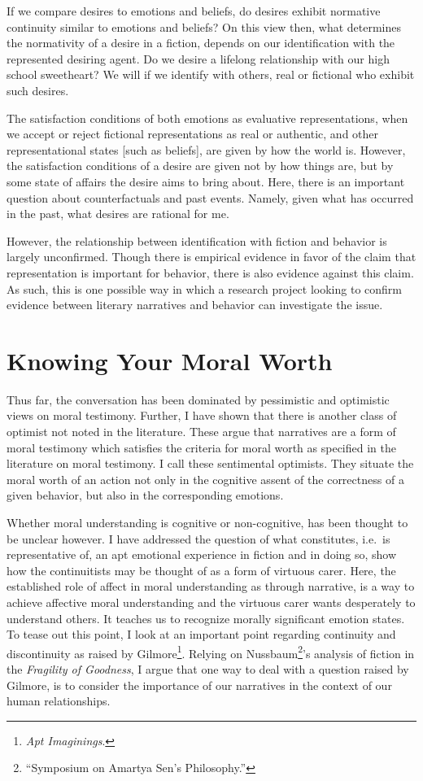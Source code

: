 \documentclass[phdthesis,12pt,final,a4paper]{wuthesis}
\theoremstyle{definition}
\theoremstyle{definition}
\theoremstyle{definition}
\theoremstyle{definition}
\theoremstyle{remark}
\begin{document}
If we compare desires to emotions and beliefs, do desires exhibit normative continuity similar to emotions and beliefs? On this view then, what determines the normativity of a desire in a fiction, depends on our identification with the represented desiring agent. Do we desire a lifelong relationship with our high school sweetheart? We will if we identify with others, real or fictional who exhibit such desires.

The satisfaction conditions of both emotions as evaluative representations, when we accept or reject fictional representations as real or authentic, and other representational states {[}such as beliefs{]}, are given by how the world is. However, the satisfaction conditions of a desire are given not by how things are, but by some state of affairs the desire aims to bring about. Here, there is an important question about counterfactuals and past events. Namely, given what has occurred in the past, what desires are rational for me.

However, the relationship between identification with fiction and behavior is largely unconfirmed. Though there is empirical evidence in favor of the claim that representation is important for behavior, there is also evidence against this claim. As such, this is one possible way in which a research project looking to confirm evidence between literary narratives and behavior can investigate the issue.

\chapter{Knowing Your Moral Worth}\label{knowing-your-moral-worth}

Thus far, the conversation has been dominated by pessimistic and optimistic views on moral testimony. Further, I have shown that there is another class of optimist not noted in the literature. These argue that narratives are a form of moral testimony which satisfies the criteria for moral worth as specified in the literature on moral testimony. I call these sentimental optimists. They situate the moral worth of an action not only in the cognitive assent of the correctness of a given behavior, but also in the corresponding emotions.

Whether moral understanding is cognitive or non-cognitive, has been thought to be unclear however. I have addressed the question of what constitutes, i.e.~is representative of, an apt emotional experience in fiction and in doing so, show how the continuitists may be thought of as a form of virtuous carer. Here, the established role of affect in moral understanding as through narrative, is a way to achieve affective moral understanding and the virtuous carer wants desperately to understand others. It teaches us to recognize morally significant emotion states. To tease out this point, I look at an important point regarding continuity and discontinuity as raised by Gilmore\footnote{\emph{Apt {Imaginings}}.}. Relying on Nussbaum\footnote{{``Symposium on {Amartya Sen}'s Philosophy.''}}'s analysis of fiction in the \emph{Fragility of Goodness}, I argue that one way to deal with a question raised by Gilmore, is to consider the importance of our narratives in the context of our human relationships.
\end{document}
